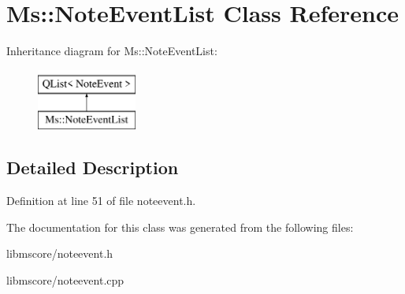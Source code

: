 \hypertarget{class_ms_1_1_note_event_list}{}\section{Ms\+:\+:Note\+Event\+List Class Reference}
\label{class_ms_1_1_note_event_list}
Inheritance diagram for Ms\+:\+:Note\+Event\+List\+:\begin{figure}[H]
\begin{center}
\leavevmode
\includegraphics[height=2.000000cm]{class_ms_1_1_note_event_list}
\end{center}
\end{figure}


\subsection{Detailed Description}


Definition at line 51 of file noteevent.\+h.



The documentation for this class was generated from the following files\+:\begin{DoxyCompactItemize}
\item 
libmscore/noteevent.\+h\item 
libmscore/noteevent.\+cpp\end{DoxyCompactItemize}
